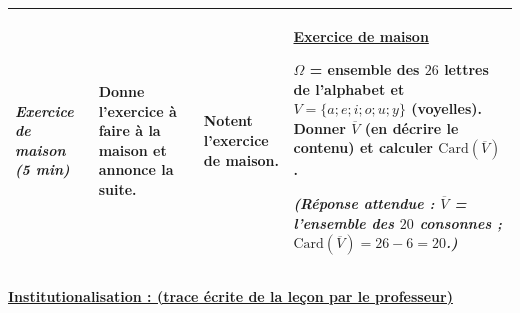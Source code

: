 \documentclass[10pt]{article}
\newcommand{\maison}{\underline{\textcolor{rougemaison}{\bfseries Exercice de maison}}}
\newcommand{\moment}[1]{\textbf{\itshape #1}}
\begin{document}
\begin{longtable}{|p{2.35cm}|p{5.35cm}|p{4.55cm}|p{13.85cm}|}
\moment{Exercice de maison (5 min)} &
Donne l'exercice à faire à la maison et annonce la suite. &
Notent l'exercice de maison. &
\maison \par
$\Omega$ = ensemble des $26$ lettres de l'alphabet et $V=\{a;e;i;o;u;y\}$ (voyelles).
Donner $\overline{V}$ (en décrire le contenu) et calculer $\mathrm{Card}(\overline{V})$. \par
\textit{(Réponse attendue : $\overline{V}$ = l'ensemble des $20$ consonnes ;
$\mathrm{Card}(\overline{V})=26-6=20$.)} \\ \hline
\end{longtable}

\begin{center}
\underline{\textcolor{rougetitre}{\large\bfseries Institutionalisation \; : \; (trace écrite de la leçon par le professeur)}}
\end{center}
\end{document}
